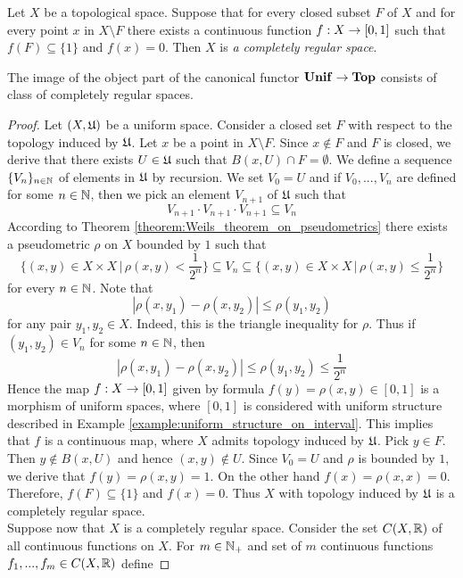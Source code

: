 \begin{definition}
Let $X$ be a topological space. Suppose that for every closed subset $F$ of $X$ and for every point $x$ in $X\setminus  F$ there exists a continuous function $f:X\rightarrow [0,1]$ such that $f(F) \subseteq \{1\}$ and $f(x) = 0$. Then $X$ is \textit{a completely regular space}. 
\end{definition}

\begin{theorem}\label{theorem:image_of_the_canonical_functor_is_completely_regular_space}
The image of the object part of the canonical functor $\mathbf{Unif} \rightarrow \mathbf{Top}$ consists of class of completely regular spaces.
\end{theorem}
\begin{proof}
Let $(X,{\mathfrak U})$ be a uniform space. Consider a closed set $F$ with respect to the topology induced by ${\mathfrak U}$. Let $x$ be a point in $X\setminus F$. Since $x \not \in F$ and $F$ is closed, we derive that there exists $U \in {\mathfrak U}$ such that $B(x,U)\cap F = \emptyset$. We define a sequence $\{V_n\}_{n\in {\mathbb N}}$ of elements in ${\mathfrak U}$ by recursion. We set $V_0 = U$ and if $V_0,...,V_n$ are defined for some $n\in {\mathbb N}$, then we pick an element $V_{n+1}$ of ${\mathfrak U}$ such that 
$$V_{n+1}\cdot V_{n+1}\cdot V_{n+1} \subseteq V_n$$
According to Theorem \ref{theorem:Weils_theorem_on_pseudometrics} there exists a pseudometric $\rho$ on $X$ bounded by $1$ such that
$$\bigg\{(x,y)\in X\times X\,\bigg|\,\rho(x,y)<\frac{1}{2^n}\bigg\} \subseteq V_n \subseteq \bigg\{(x,y)\in X\times X\,\bigg|\,\rho(x,y) \leq \frac{1}{2^n}\bigg\}$$
for every $n\in {\mathbb N}$. Note that
$$|\rho(x,y_1) - \rho(x,y_2)| \leq \rho(y_1,y_2)$$
for any pair $y_1,y_2\in X$. Indeed, this is the triangle inequality for $\rho$. Thus if $(y_1,y_2) \in V_n$ for some $n\in {\mathbb N}$, then
$$|\rho(x,y_1) - \rho(x,y_2)| \leq \rho(y_1,y_2) \leq \frac{1}{2^n}$$
Hence the map $f:X\rightarrow [0,1]$ given by formula $f(y) = \rho(x,y)\in [0,1]$ is a morphism of uniform spaces, where $[0,1]$ is considered with uniform structure described in Example \ref{example:uniform_structure_on_interval}. This implies that $f$ is a continuous map, where $X$ admits topology induced by ${\mathfrak U}$. Pick $y\in F$. Then $y \not \in B(x,U)$ and hence $(x,y) \not \in U$. Since $V_0 = U$ and $\rho$ is bounded by $1$, we derive that $f(y) = \rho(x,y) = 1$. On the other hand $f(x) = \rho(x,x) = 0$. Therefore, $f(F) \subseteq \{1\}$ and $f(x) = 0$. Thus $X$ with topology induced by ${\mathfrak U}$ is a completely regular space.\\
Suppose now that $X$ is a completely regular space. Consider the set $C(X,{\mathbb R})$ of all continuous functions on $X$. For $m\in {\mathbb N}_+$ and set of $m$ continuous functions $f_1,...,f_m\in C(X,{\mathbb R})$ define

\end{proof}
